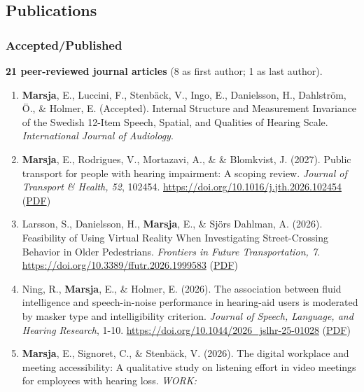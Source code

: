 \documentclass[]{article}
\begin{document}
\subsection{Publications}\label{publications}

\subsubsection{Accepted/Published}\label{acceptedpublished}

\textbf{21 peer-reviewed journal articles} (8 as first author; 1 as last
author).

\begin{enumerate}
\def\labelenumi{\arabic{enumi}.}
\item
  \textbf{Marsja}, E., Luccini, F., Stenbäck, V., Ingo, E., Danielsson,
  H., Dahlström, Ö., \& Holmer, E. (Accepted). Internal Structure and
  Measurement Invariance of the Swedish 12-Item Speech, Spatial, and
  Qualities of Hearing Scale. \emph{International Journal of Audiology}.
\item
  \textbf{Marsja}, E., Rodrigues, V., Mortazavi, A., \& \& Blomkvist, J.
  (2027). Public transport for people with hearing impairment: A scoping
  review. \emph{Journal of Transport \& Health, 52}, 102454.
  \url{https://doi.org/10.1016/j.jth.2026.102454}
  (\href{https://drive.google.com/file/d/1Ec9miqeO2wU7uOoXzluMigdVlJJYZLVf/view?usp=drive_link}{PDF})
\item
  Larsson, S., Danielsson, H., \textbf{Marsja}, E., \& Sjörs Dahlman, A.
  (2026). Feasibility of Using Virtual Reality When Investigating
  Street-Crossing Behavior in Older Pedestrians. \emph{Frontiers in
  Future Transportation, 7}.
  \url{https://doi.org/10.3389/ffutr.2026.1999583}
  (\href{https://drive.google.com/file/d/12zxU15DMS8if9eihQU71NgwLJa0pMQyv/view?usp=drive_link}{PDF})
\item
  Ning, R., \textbf{Marsja}, E., \& Holmer, E. (2026). The association
  between fluid intelligence and speech-in-noise performance in
  hearing-aid users is moderated by masker type and intelligibility
  criterion. \emph{Journal of Speech, Language, and Hearing Research},
  1-10. \url{https://doi.org/10.1044/2026_jslhr-25-01028}
  (\href{https://drive.google.com/file/d/1kv_2JQTxy-GMHlXq8YTSwUTRN8K1VDWw/view?usp=drive_link}{PDF})
\item
  \textbf{Marsja}, E., Signoret, C., \& Stenbäck, V. (2026). The digital
  workplace and meeting accessibility: A qualitative study on listening
  effort in video meetings for employees with hearing loss. \emph{WORK:
}
\end{enumerate}
\end{document}
